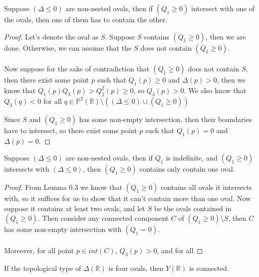 \documentclass{article}
\newcommand{\Rbb}{\mathbb{R}}
\newcommand{\Pbb}{\mathbb{P}}
\begin{document}
\begin{lemma}
Suppose $(\Delta \leq 0)$ are non-nested ovals, then if $(Q_1 \geq 0)$ intersect with one of the ovals, then one of them has to contain the other.
\end{lemma}

\begin{proof}
Let's denote the oval as $S$. Suppose $S$ contains $(Q_1 \geq 0)$, then we are done. Otherwise, we can assume that the $S$ does not contain $(Q_1 \geq 0)$.\\\\
Now suppose for the sake of contradiction that $(Q_1 \geq 0)$ does not contain $S$, then there exist some point $p$ such that $Q_1(p) \geq 0$ and $\Delta(p) > 0$, then we know that $Q_1(p)Q_3(p) > Q_2^2(p) \geq 0$, so $Q_3(p) > 0$.
We also know that $Q_3(q) < 0$ for all $q \in \Pbb^2(\Rbb) \setminus ((\Delta \leq 0) \cup (Q_1 \geq 0))$

Since $S$ and $(Q_1 \geq 0)$ has some non-empty intersection, then their boundaries have to intersect, so there exist some point $p$ such that $Q_1(p) = 0$ and $\Delta(p) = 0$.
\end{proof}

\begin{lemma}
Suppose $(\Delta \leq 0)$ are non-nested ovals, then if $Q_1$ is indefinite, and $(Q_1 \geq 0)$ intersects with $(\Delta \leq 0)$, then $(Q_1 \geq 0)$ contains only contain one oval. 
\end{lemma}

\begin{proof}
From Lemma 0.3 we know that $(Q_1 \geq 0)$ contains all ovals it intersects with, so it suffices for us to show that it can't contain more than one oval. Now suppose it contains at least two ovals, and let $S$ be the ovals contained in $(Q_1 \geq 0)$. Then consider any connected component $C$ of $(Q_1 \geq 0) \setminus S$, then $C$ has some non-empty intersection with $(Q_1 = 0)$.\\\\
Moreover, for all point $p \in int(C)$, $Q_3(p) > 0$, and for all
\end{proof}

\begin{proposition}
If the topological type of $\Delta(\Rbb)$ is four ovals, then $Y(\Rbb)$ is connected.
\end{proposition}
\end{document}
